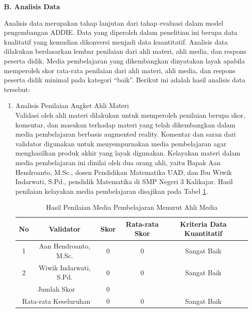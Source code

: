 \documentclass[12pt]{article}
\begin{document}
\textbf{B. Analisis Data}

\hspace{1cm}Analisis data merupakan tahap lanjutan dari tahap evaluasi dalam model pengembangan ADDIE. Data yang diperoleh dalam penelitian ini berupa data kualitatif yang kemudian dikonversi menjadi data kuantitatif. Analisis data dilakukan berdasarkan lembar penilaian dari ahli materi, ahli media, dan respons peserta didik. Media pembelajaran yang dikembangkan dinyatakan layak apabila memperoleh skor rata-rata penilaian dari ahli materi, ahli media, dan respons peserta didik minimal pada kategori “baik”. Berikut ini adalah hasil analisis data tersebut:
\begin{enumerate}
    \item Analisis Penilaian Angket Ahli Materi\\
    \hspace*{1cm}Validasi oleh ahli materi dilakukan untuk memperoleh penilaian berupa skor, komentar, dan masukan terhadap materi yang telah dikembangkan dalam media pembelajaran berbasis augmented reality. Komentar dan saran dari validator digunakan untuk menyempurnakan media pembelajaran agar menghasilkan produk akhir yang layak digunakan. Kelayakan materi dalam media pembelajaran ini dinilai oleh dua orang ahli, yaitu Bapak Aan Hendroanto, M.Sc., dosen Pendidikan Matematika UAD, dan Ibu Wiwik Indarwati, S.Pd., pendidik Matematika di SMP Negeri 3 Kalikajar. Hasil penilaian kelayakan media pembelajaran disajikan pada Tabel \ref{penilaianmateri}.
    \begin{table}[H]
        \begin{adjustwidth}{-2cm}{-2cm}
            \centering
            \caption{Hasil Penilaian Media Pembelajaran Menurut Ahli Media}
            \label{penilaianmateri}
            \begin{tabular}{|c|c|c|c|c|c|}
                \hline
                \textbf{No} & \textbf{Validator} & \textbf{Skor} & \textbf{Rata-rata Skor} & \textbf{Kriteria Data Kuantitatif}\\
                \hline
                1 & Aan Hendroanto, M.Sc. & 0 & 0 & Sangat Baik\\
                2 & Wiwik Indarwati, S.Pd. & 0 & 0 & Sangat Baik\\
                \hline
                \multicolumn{2}{|c|}{Jumlah Skor} & 0 & & \\
                \hline
                \multicolumn{2}{|c|}{Rata-rata Keseluruhan} & 0 & 0 & Sangat Baik\\
                \hline
            \end{tabular}
        \end{adjustwidth}
    \end{table}


\end{enumerate}
\end{document}
